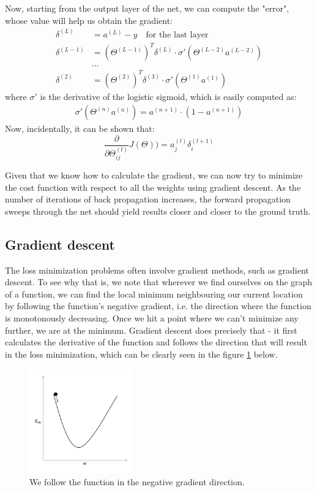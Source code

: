 \documentclass[a4paper, 12pt]{article}
\numberwithin{equation}{section}
\begin{document}
	Now, starting from the output layer of the net, we can compute the "error", whose value will help us obtain the gradient:
	\begin{align}
	\delta^{(L)} &= a^{(L)} - y \quad \textrm{for the last layer} \\
	\delta^{(L-1)} &= (\Theta ^ {(L-1)})^T \delta^{(L)} \cdot \sigma'(\Theta^{(L-2)} a^{(L-2)}) \\
	&\ldots \\
	\delta^{(2)} &= (\Theta ^ {(2)})^T \delta^{(3)} \cdot \sigma'(\Theta^{(1)} a^{(1)})
	\end{align}
	where $\sigma'$ is the derivative of the logistic sigmoid, which is easily computed as:
	\begin{align}
	\sigma'(\Theta^{(n)} a^{(n)}) = a^{(n+1)} \cdot (1-a^{(n+1)})
	\end{align}
	Now, incidentally, it can be shown that:
	\begin{equation}
	\frac{\partial}{\partial \Theta_{ij}^{(l)}} J(\Theta)) = a_j^{(l)} \delta_i^{(l+1)}
	\end{equation}

	Given that we know how to calculate the gradient, we can now try to minimize the cost function with respect to all the weights using gradient descent. As the number of iterations of back propagation increases, the forward propagation sweeps through the net should yield results closer and closer to the ground truth.

	\subsection{Gradient descent}
	The loss minimization problems often involve gradient methods, such as gradient descent. To see why that is, we note that wherever we find ourselves on the graph of a function, we can find the local minimum neighbouring our current location by following the function's negative gradient, i.e. the direction where the function is monotonously decreasing. Once we hit a point where we can't minimize any further, we are at the minimum. Gradient descent does precisely that - it first calculates the derivative of the function and follows the direction that will result in the loss minimization, which can be clearly seen in the figure \ref{fig:graddesc} below.

	\begin{figure}[!h]
		\centering
		\includegraphics[page=1,width=0.40\textwidth]{graddesc.pdf}
		\caption{\label{fig:graddesc}{We follow the function in the negative gradient direction.}}
	\end{figure}
\end{document}
